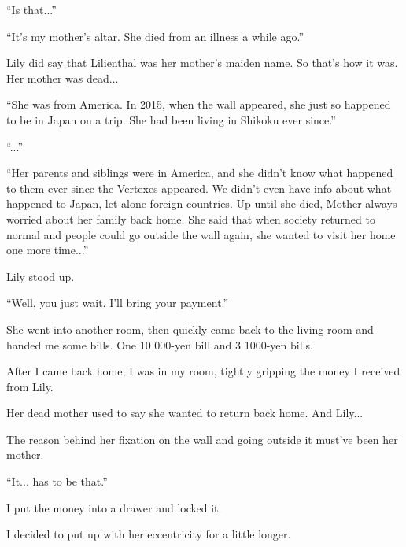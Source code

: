 ``Is that...''

``It's my mother's altar. She died from an illness a while ago.''

Lily did say that Lilienthal was her mother's maiden name. So that's how it was. Her mother was dead...

``She was from America. In 2015, when the wall appeared, she just so happened to be in Japan on a trip. She had been living in Shikoku ever since.''

``...''

``Her parents and siblings were in America, and she didn’t know what happened to them ever since the Vertexes appeared. We didn't even have info about what happened to Japan, let alone foreign countries. Up until she died, Mother always worried about her family back home. She said that when society returned to normal and people could go outside the wall again, she wanted to visit her home one more time...''

Lily stood up.

``Well, you just wait. I'll bring your payment.''

She went into another room, then quickly came back to the living room and handed me some bills. One 10 000-yen bill and 3 1000-yen bills.

After I came back home, I was in my room, tightly gripping the money I received from Lily.

Her dead mother used to say she wanted to return back home. And Lily...

The reason behind her fixation on the wall and going outside it must've been her mother.

``It... has to be that.''

I put the money into a drawer and locked it.

I decided to put up with her eccentricity for a little longer.

